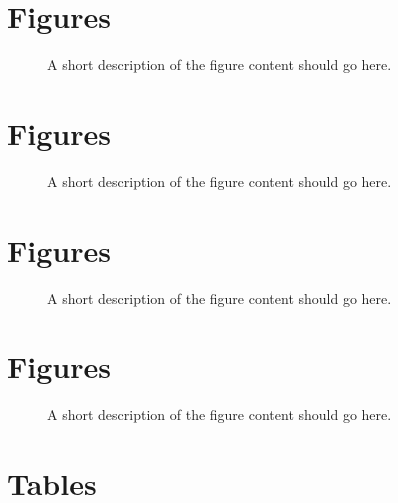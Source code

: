 \documentclass[parskip=full]{bmcart}
\begin{document}
\begin{backmatter}
\section*{Figures}
\begin{figure}[h!]
\caption{
A short description of the figure content
should go here.}
\label{figureSM}
\end{figure}

\section*{Figures}
\begin{figure}[h!]
\caption{
A short description of the figure content
should go here.}
\label{figureLitre}
\end{figure}

\section*{Figures}
\begin{figure}[h!]
\caption{
A short description of the figure content
should go here.}
\label{figureVolcano}
\end{figure}

\section*{Figures}
\begin{figure}[h!]
\caption{
A short description of the figure content
should go here.}
\label{figurePCP}
\end{figure}


\section*{Tables}


\end{backmatter}
\end{document}
